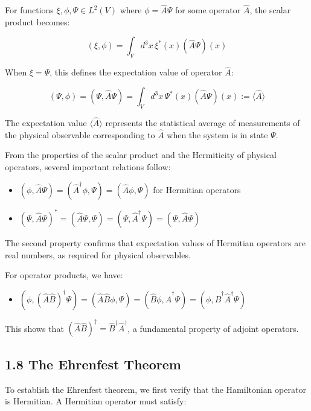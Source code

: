 \documentclass[10pt]{article}
\begin{document}
For functions $\xi, \phi, \Psi \in L^2(V)$ where $\phi = \hat{A}\Psi$ for some operator $\hat{A}$, the scalar product becomes:

\begin{equation*}
(\xi, \phi) = \int_V d^3x \, \xi^*(x)(\hat{A}\Psi)(x) \tag{1.80}
\end{equation*}

When $\xi = \Psi$, this defines the expectation value of operator $\hat{A}$:

\begin{equation*}
(\Psi, \phi) = (\Psi, \hat{A}\Psi) = \int_V d^3x \, \Psi^*(x)(\hat{A}\Psi)(x) := \langle\hat{A}\rangle \tag{1.81}
\end{equation*}

The expectation value $\langle\hat{A}\rangle$ represents the statistical average of measurements of the physical observable corresponding to $\hat{A}$ when the system is in state $\Psi$.

From the properties of the scalar product and the Hermiticity of physical operators, several important relations follow:

\begin{itemize}
  \item $(\phi, \hat{A}\Psi) = (\hat{A}^\dagger\phi, \Psi) = (\hat{A}\phi, \Psi)$ for Hermitian operators
  \item $(\Psi, \hat{A}\Psi)^* = (\hat{A}\Psi, \Psi) = (\Psi, \hat{A}^\dagger\Psi) = (\Psi, \hat{A}\Psi)$
\end{itemize}

The second property confirms that expectation values of Hermitian operators are real numbers, as required for physical observables.

For operator products, we have:
\begin{itemize}
  \item $(\phi, (\hat{A}\hat{B})^\dagger\Psi) = (\hat{A}\hat{B}\phi, \Psi) = (\hat{B}\phi, \hat{A}^\dagger\Psi) = (\phi, \hat{B}^\dagger\hat{A}^\dagger\Psi)$
\end{itemize}

This shows that $(\hat{A}\hat{B})^\dagger = \hat{B}^\dagger\hat{A}^\dagger$, a fundamental property of adjoint operators.

\subsection*{1.8 The Ehrenfest Theorem}

To establish the Ehrenfest theorem, we first verify that the Hamiltonian operator is Hermitian. A Hermitian operator must satisfy:
\end{document}
